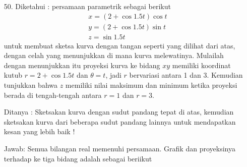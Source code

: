 \documentclass[twoside]{scrarticle}
\begin{document}
\begin{enumerate}
		\item[50.] Diketahui : persamaan parametrik sebagai berikut
		\begin{equation*}
			\begin{aligned}
				& x=(2+\cos 1.5 t) \cos t \\
				& y=(2+\cos 1.5 t) \sin t \\
				& z=\sin 1.5 t
			\end{aligned}
		\end{equation*}
		untuk membuat sketsa kurva dengan tangan seperti yang dilihat dari atas, dengan celah yang menunjukkan di mana kurva melewatinya. Mulailah dengan menunjukkan itu proyeksi kurva ke bidang $x y$ memiliki koordinat kutub $r=2+\cos 1.5 t$ dan $\theta=t$, jadi $r$ bervariasi antara 1 dan 3. Kemudian tunjukkan bahwa $z$ memiliki nilai maksimum dan minimum ketika proyeksi berada di tengah-tengah antara $r=1$ dan $r=3$.
		
		Ditanya : Sketsakan kurva dengan sudut pandang tepat di atas, kemudian sketsakan kurva dari beberapa sudut pandang lainnya untuk mendapatkan kesan yang lebih baik ! 
		
		Jawab: Semua bilangan real memenuhi persamaan. Grafik dan proyeksinya terhadap ke tiga bidang adalah sebagai beriikut
		

\end{enumerate}
\end{document}
